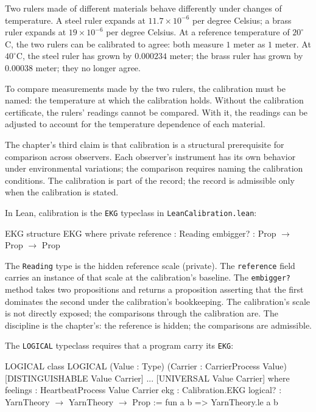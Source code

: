 Two rulers made of different materials behave differently under
changes of temperature. A steel ruler expands at $11.7 \times
10^{-6}$ per degree Celsius; a brass ruler expands at $19 \times
10^{-6}$ per degree Celsius. At a reference temperature of
$20^\circ$C, the two rulers can be calibrated to agree: both
measure $1$ meter as $1$ meter. At $40^\circ$C, the steel ruler
has grown by $0.000234$ meter; the brass ruler has grown by
$0.00038$ meter; they no longer agree.

To compare measurements made by the two rulers, the calibration
must be named: the temperature at which the calibration holds.
Without the calibration certificate, the rulers' readings cannot
be compared. With it, the readings can be adjusted to account for
the temperature dependence of each material.

The chapter's third claim is that calibration is a structural
prerequisite for comparison across observers. Each observer's
instrument has its own behavior under environmental variations;
the comparison requires naming the calibration conditions. The
calibration is part of the record; the record is admissible
only when the calibration is stated.

In Lean, calibration is the \texttt{EKG} typeclass in
\texttt{LeanCalibration.lean}:

\begin{leanexcerpt}{EKG}
structure EKG where
  private reference : Reading
  embigger? : Prop $\to$ Prop $\to$ Prop
\end{leanexcerpt}

The \texttt{Reading} type is the hidden reference scale (private).
The \texttt{reference} field carries an instance of that scale at
the calibration's baseline. The \texttt{embigger?} method takes
two propositions and returns a proposition asserting that the
first dominates the second under the calibration's bookkeeping.
The calibration's scale is not directly exposed; the comparisons
through the calibration are. The discipline is the chapter's: the
reference is hidden; the comparisons are admissible.

The \texttt{LOGICAL} typeclass requires that a program carry its
\texttt{EKG}:

\begin{leanexcerpt}{LOGICAL}
class LOGICAL
    (Value : Type)
    (Carrier : CarrierProcess Value)
    [DISTINGUISHABLE Value Carrier] ... [UNIVERSAL Value Carrier]
  where
  feelings : HeartbeatProcess Value Carrier
  ekg      : Calibration.EKG
  logical? : YarnTheory $\to$ YarnTheory $\to$ Prop := fun a b =>
    YarnTheory.le a b
\end{leanexcerpt}

